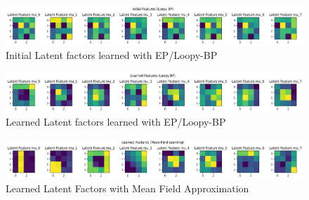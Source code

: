 \documentclass[12pt]{article}
\begin{document}
\begin{figure}[h]
\centering
\includegraphics[scale=0.4]{outputs/q6/all-init-latent-factors}
\caption{Initial Latent factors learned with EP/Loopy-BP}
\label{fig:6-init-latent-factors}
\end{figure}

\begin{figure}[h]
\centering
\includegraphics[scale=0.4]{outputs/q6/all-latent-factors}
\caption{Learned Latent factors learned with EP/Loopy-BP}
\label{fig:6-latent-factors}
\end{figure}

\begin{figure}[h]
\centering
\includegraphics[scale=0.4]{outputs/q3/f-latent-factors}
\caption{Learned Latent Factors with Mean Field Approximation}
\label{fig:3f-latent-factors}
\end{figure}

\newpage
\end{document}
